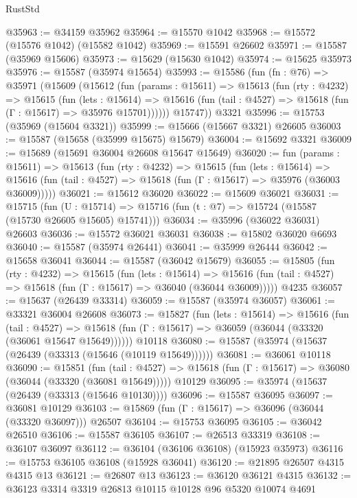 \begin{lexlean}{RustStd}
\begin{coremodule}
@35963 := @34159 @35962
@35964 := @15570 @1042
@35968 := @15572 (@15576 @1042) (@15582 @1042)
@35969 := @15591 @26602
@35971 := @15587 (@35969 @15606)
@35973 := @15629 (@15630 @1042)
@35974 := @15625 @35973
@35976 := @15587 (@35974 @15654)
@35993 := @15586
    (fun (fn : @76) =>
    @35971
      (@15609
        (@15612
          (fun (params : @15611) =>
          @15613
            (fun (rty : @4232) =>
            @15615
              (fun (lets : @15614) =>
              @15616 (fun (tail : @4527) => @15618 (fun (Γ : @15617) => @35976 @15701))))))
        @15747))
    @3321
@35996 := @15753 (@35969 (@15604 @3321))
@35999 := @15666 (@15667 @3321) @26605
@36003 := @15587 (@15658 (@35999 @15675) @15679)
@36004 := @15692 @3321
@36009 := @15689 (@15691 @36004 @26608 @15647 @15649)
@36020 := fun (params : @15611) =>
  @15613
    (fun (rty : @4232) =>
    @15615
      (fun (lets : @15614) =>
      @15616 (fun (tail : @4527) => @15618 (fun (Γ : @15617) => @35976 (@36003 @36009)))))
@36021 := @15612 @36020
@36022 := @15609 @36021
@36031 := @15715
    (fun (U : @15714) => @15716 (fun (t : @7) => @15724 (@15587 (@15730 @26605 @15605) @15741)))
@36034 := @35996 (@36022 @36031) @26603
@36036 := @15572 @36021 @36031
@36038 := @15802 @36020 @6693
@36040 := @15587 (@35974 @26441)
@36041 := @35999 @26444
@36042 := @15658 @36041
@36044 := @15587 (@36042 @15679)
@36055 := @15805
    (fun (rty : @4232) =>
    @15615
      (fun (lets : @15614) =>
      @15616 (fun (tail : @4527) => @15618 (fun (Γ : @15617) => @36040 (@36044 @36009)))))
    @4235
@36057 := @15637 (@26439 @33314)
@36059 := @15587 (@35974 @36057)
@36061 := @33321 @36004 @26608
@36073 := @15827
    (fun (lets : @15614) =>
    @15616
      (fun (tail : @4527) =>
      @15618 (fun (Γ : @15617) => @36059 (@36044 (@33320 (@36061 @15647 @15649))))))
    @10118
@36080 := @15587 (@35974 (@15637 (@26439 (@33313 (@15646 (@10119 @15649))))))
@36081 := @36061 @10118
@36090 := @15851
    (fun (tail : @4527) => @15618 (fun (Γ : @15617) => @36080 (@36044 (@33320 (@36081 @15649)))))
    @10129
@36095 := @35974 (@15637 (@26439 (@33313 (@15646 @10130))))
@36096 := @15587 @36095
@36097 := @36081 @10129
@36103 := @15869 (fun (Γ : @15617) => @36096 (@36044 (@33320 @36097))) @26507
@36104 := @15753 @36095
@36105 := @36042 @26510
@36106 := @15587 @36105
@36107 := @26513 @33319
@36108 := @36107 @36097
@36112 := @36104 (@36106 @36108) (@15923 @35973)
@36116 := @15753 @36105 @36108 (@15928 @36041)
@36120 := @21895 @26507 @4315 @4315 @13
@36121 := @26807 @13
@36123 := @36120 @36121 @4315
@36132 := @36123 @3314 @3319 @26813 @10115 @10128 @96 @5320 @10074 @4691

\end{coremodule}
\end{lexlean}
